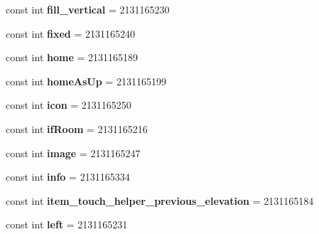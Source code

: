 \begin{DoxyCompactItemize}
const int {\bfseries fill\+\_\+vertical} = 2131165230
\item 
\mbox{\label{class_pinned_app_1_1_droid_1_1_resource_1_1_id_a8caa64979cef50475d177fc72ddf5663}} 
const int {\bfseries fixed} = 2131165240
\item 
\mbox{\label{class_pinned_app_1_1_droid_1_1_resource_1_1_id_adb05ce1e1b7e7862e4a6020e83d22e78}} 
const int {\bfseries home} = 2131165189
\item 
\mbox{\label{class_pinned_app_1_1_droid_1_1_resource_1_1_id_a1b593c1ea4613a392f3fe1452c2d7acf}} 
const int {\bfseries home\+As\+Up} = 2131165199
\item 
\mbox{\label{class_pinned_app_1_1_droid_1_1_resource_1_1_id_acf5d103a083bb951b527fe351f1a3e1d}} 
const int {\bfseries icon} = 2131165250
\item 
\mbox{\label{class_pinned_app_1_1_droid_1_1_resource_1_1_id_a6974b23676592831ca8567a4168154eb}} 
const int {\bfseries if\+Room} = 2131165216
\item 
\mbox{\label{class_pinned_app_1_1_droid_1_1_resource_1_1_id_a0e5fc45baaf161ef9cc7c53782e7d7a7}} 
const int {\bfseries image} = 2131165247
\item 
\mbox{\label{class_pinned_app_1_1_droid_1_1_resource_1_1_id_ac8791d1ee8263c7154bd006ca5bcfe59}} 
const int {\bfseries info} = 2131165334
\item 
\mbox{\label{class_pinned_app_1_1_droid_1_1_resource_1_1_id_a66c97f59b9cbf538879e793d3744e757}} 
const int {\bfseries item\+\_\+touch\+\_\+helper\+\_\+previous\+\_\+elevation} = 2131165184
\item 
\mbox{\label{class_pinned_app_1_1_droid_1_1_resource_1_1_id_a9654cdcf1de269849e4119c6c26d9bf1}} 
const int {\bfseries left} = 2131165231

\end{DoxyCompactItemize}
